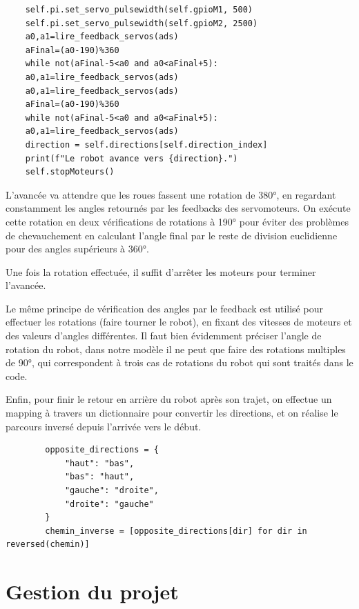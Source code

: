 \documentclass[a4paper,12pt]{report}  %
\begin{document}
\begin{lstlisting}
	self.pi.set_servo_pulsewidth(self.gpioM1, 500)
	self.pi.set_servo_pulsewidth(self.gpioM2, 2500)
	a0,a1=lire_feedback_servos(ads)
	aFinal=(a0-190)%360
	while not(aFinal-5<a0 and a0<aFinal+5):
	a0,a1=lire_feedback_servos(ads)
	a0,a1=lire_feedback_servos(ads)
	aFinal=(a0-190)%360
	while not(aFinal-5<a0 and a0<aFinal+5):
	a0,a1=lire_feedback_servos(ads)
	direction = self.directions[self.direction_index]
	print(f"Le robot avance vers {direction}.")
	self.stopMoteurs()
\end{lstlisting}


L’avancée va attendre que les roues fassent une rotation de 380°, en regardant constamment les angles retournés par les feedbacks des servomoteurs. On exécute cette rotation en deux vérifications de rotations à 190° pour éviter des problèmes de chevauchement en calculant l’angle final par le reste de division euclidienne pour des angles supérieurs à 360°.

Une fois la rotation effectuée, il suffit d’arrêter les moteurs pour terminer l’avancée.

Le même principe de vérification des angles par le feedback est utilisé pour effectuer les rotations (faire tourner le robot), en fixant des vitesses de moteurs et des valeurs d’angles différentes. Il faut bien évidemment préciser l’angle de rotation du robot, dans notre modèle il ne peut que faire des rotations multiples de 90°, qui correspondent à trois cas de rotations du robot qui sont traités dans le code.

Enfin, pour finir le retour en arrière du robot après son trajet, on effectue un mapping à travers un dictionnaire pour convertir les directions, et on réalise le parcours inversé depuis l’arrivée vers le début.

{\scriptsize
	\begin{lstlisting}
		opposite_directions = {
			"haut": "bas",
			"bas": "haut",
			"gauche": "droite",
			"droite": "gauche"
		}
		chemin_inverse = [opposite_directions[dir] for dir in reversed(chemin)]
	\end{lstlisting}
}


\pagebreak
\section{Gestion du projet}

\end{document}

